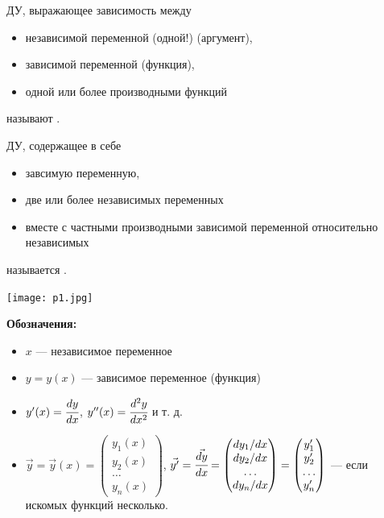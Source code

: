 \begin{Def}
ДУ, выражающее зависимость между
\begin{itemize}
    \item независимой переменной (одной!) (аргумент),
    \item зависимой переменной (функция),
    \item одной или более производными функций
\end{itemize}
называют .
\end{Def}
\newpage
\begin{Def}
ДУ, содержащее в себе
\begin{itemize}
    \item завсимую переменную,
    \item две или более независимых переменных
    \item вместе с частными производными зависимой переменной относительно независимых
\end{itemize}
называется .
\end{Def}
\begin{center}
    \texttt{[image: p1.jpg]}
\end{center}

\textbf{Обозначения:}
\begin{itemize}
    \item $x$ --- независимое переменное
    \item $y = y(x)$ --- зависимое переменное (функция)
    \item $y'(x) = \cfrac{dy}{dx}$, $y''(x) = \cfrac{d^2y}{dx^2}$ и т. д.
    \item $\vec{y} = \vec{y}(x) = 
    \begin{pmatrix}
    y_1(x)\\
    y_2(x)\\
    \ldots\\
    y_n(x)
    \end{pmatrix}$, 
    $\vec{y'} = \cfrac{\vec{dy}}{dx} = 
    \begin{pmatrix}
    dy_1/dx\\
    dy_2/dx\\
    \ldots\\
    dy_n/dx
    \end{pmatrix} = 
    \begin{pmatrix}
    y_1'\\
    y_2'\\
    \ldots\\
    y'_n
    \end{pmatrix}$ --- если искомых функций несколько.
\end{itemize}

